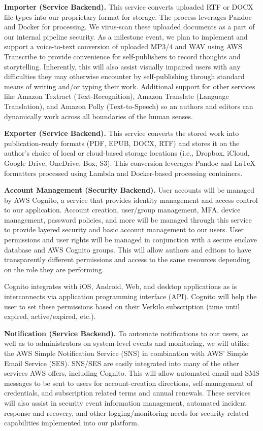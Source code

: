\documentclass[10pt,openany]{book}
\begin{document}
\textbf{Importer (Service Backend).} This service converts uploaded RTF
or DOCX file types into our proprietary format for storage. The process
leverages Pandoc and Docker for processing. We virus-scan these uploaded
documents as a part of our internal pipeline security. As a milestone
event, we plan to implement and support a voice-to-text conversion of
uploaded MP3/4 and WAV using AWS Transcribe to provide convenience for
self-publishers to record thoughts and storytelling. Inherently, this
will also assist visually impaired users with any difficulties they may
otherwise encounter by self-publishing through standard means of writing
and/or typing their work. Additional support for other services like
Amazon Textract (Text-Recognition), Amazon Translate (Language
Translation), and Amazon Polly (Text-to-Speech) so an authors and
editors can dynamically work across all boundaries of the human senses.

\textbf{Exporter (Service Backend).} This service converts the stored
work into publication-ready formats (PDF, EPUB, DOCX, RTF) and stores it
on the author's choice of local or cloud-based storage locations (i.e.,
Dropbox, iCloud, Google Drive, OneDrive, Box, S3). This conversion
leverages Pandoc and LaTeX formatters processed using Lambda and
Docker-based processing containers.

\textbf{Account Management (Security Backend).} User accounts will be
managed by AWS Cognito, a service that provides identity management and
access control to our application. Account creation, user/group
management, MFA, device management, password policies, and more will be
managed through this service to provide layered security and basic
account management to our users. User permissions and user rights will
be managed in conjunction with a secure enclave database and AWS Cognito
groups. This will allow authors and editors to have transparently
different permissions and access to the same resources depending on the
role they are performing.

Cognito integrates with iOS, Android, Web, and desktop applications as
is interconnects via application programming interface (API). Cognito
will help the user to set these permissions based on their Verkilo
subscription (time until expired, active/expired, etc.).

\textbf{Notification (Service Backend).} To automate notifications to
our users, as well as to administrators on system-level events and
monitoring, we will utilize the AWS Simple Notification Service (SNS) in
combination with AWS' Simple Email Service (SES). SNS/SES are easily
integrated into many of the other services AWS offers, including
Cognito. This will allow automated email and SMS messages to be sent to
users for account-creation directions, self-management of credentials,
and subscription related terms and annual renewals. These services will
also assist in security event information management, automated incident
response and recovery, and other logging/monitoring needs for
security-related capabilities implemented into our platform.
\end{document}
